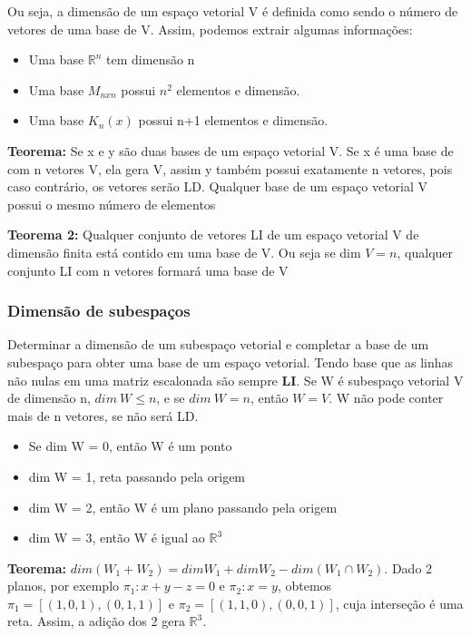 \documentclass[letterpaper, 11pt]{article}
\begin{document}
Ou seja, a dimensão de um espaço vetorial V é definida como sendo o número de vetores de uma base de V. Assim, podemos extrair algumas informações:
\begin{itemize}
\item Uma base \(\mathbb{R}^n\) tem dimensão n
\item Uma base \(M_{nxn}\) possui \(n^2\) elementos e dimensão.
\item Uma base \(K_n(x)\) possui n+1 elementos e dimensão.
\end{itemize}

\textbf{Teorema:} Se x e y são duas bases de um espaço vetorial V. Se x é uma base de com n vetores V, ela gera V, assim y também possui exatamente n vetores, pois caso contrário, os vetores serão LD. Qualquer base de um espaço vetorial V possui o mesmo número de elementos

\textbf{Teorema 2:} Qualquer conjunto de vetores LI de um espaço vetorial V de dimensão finita está contido em uma base de V. Ou seja se dim \(V = n\), qualquer conjunto LI com n vetores formará uma base de V

\subsubsection{Dimensão de subespaços}
\label{sec:org4afc3d6}
Determinar a dimensão de um subespaço vetorial e completar a base de um subespaço para obter uma base de um espaço vetorial. Tendo base que as linhas não nulas em uma matriz escalonada
são sempre \textbf{LI}. Se W é subespaço vetorial V de dimensão n, \(dim \ W \le n\), e se \(dim \ W = n\), então \(W = V\). W não pode conter mais de n vetores, se não será LD.

\begin{itemize}
\item Se dim W = 0, então W é um ponto
\item dim W = 1, reta passando pela origem
\item dim W = 2, então W é um plano passando pela origem
\item dim W = 3, então W é igual ao \(\mathbb{R}^3\)
\end{itemize}

\textbf{Teorema:} \(dim(W_1+W_2) = dim W_1 + dim W_2 - dim(W_1\cap W_2)\). Dado 2 planos, por exemplo \(\pi_1: x+y-z=0\) e \(\pi_2: x=y\), obtemos \(\pi_1 = [(1,0,1),(0,1,1)]\) e \(\pi_2 = [(1,1,0),(0,0,1)]\), cuja interseção é uma reta. Assim, a adição dos 2 gera \(\mathbb{R}^3\).
\end{document}
